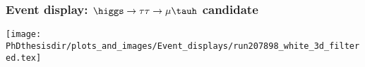 %
%

\begin{frame}
\frametitle{Event display: $\higgs\to\tau\tau\to\mu\tauh$ candidate}

\begin{center}
\texttt{[image: \\PhDthesisdir/plots\_and\_images/Event\_displays/run207898\_white\_3d\_filtered.tex]}
\end{center}

\end{frame}
